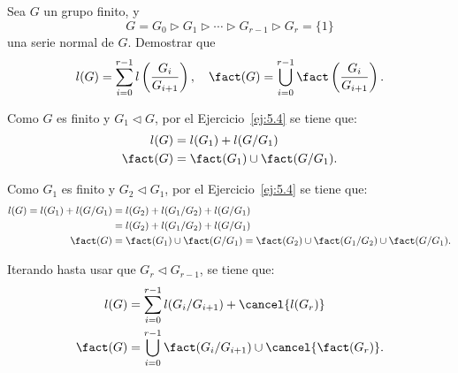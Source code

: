 \begin{ejercicio}\label{ej:5.6}
    Sea $G$ un grupo finito, y
    \[
        G = G_0 \rhd G_1 \rhd \cdots \rhd G_{r-1} \rhd G_r = \{1\}
    \]
    una serie normal de $G$. Demostrar que
    \[
        l(G) = \sum_{i=0}^{r-1} l\left(\frac{G_i}{G_{i+1}}\right), \quad \fact(G) = \bigcup_{i=0}^{r-1} \fact\left(\frac{G_i}{G_{i+1}}\right).
    \]

    Como $G$ es finito y $G_1\lhd G$, por el Ejercicio~\ref{ej:5.4} se tiene que:
    \begin{align*}
        l(G) &= l(G_1) + l(G/G_1) \\
        \fact(G) &= \fact(G_1)\cup\fact(G/G_1).
    \end{align*}

    Como $G_1$ es finito y $G_2\lhd G_1$, por el Ejercicio~\ref{ej:5.4} se tiene que:
    \begin{align*}
        l(G) = l(G_1) + l(G/G_1) &= l(G_2) + l(G_1/G_2) + l(G/G_1) \\
        &= l(G_2) + l(G_1/G_2) + l(G/G_1) \\
        \fact(G) &= \fact(G_1)\cup\fact(G/G_1) = \fact(G_2)\cup\fact(G_1/G_2)\cup\fact(G/G_1).
    \end{align*}

    Iterando hasta usar que $G_{r}\lhd G_{r-1}$, se tiene que:
    \begin{align*}
        l(G) &= \sum_{i=0}^{r-1} l(G_i/G_{i+1}) + \cancel{l(G_r)} \\
        \fact(G) &= \bigcup_{i=0}^{r-1} \fact(G_i/G_{i+1}) \cup \cancel{\fact(G_r)}.
    \end{align*}
\end{ejercicio}

